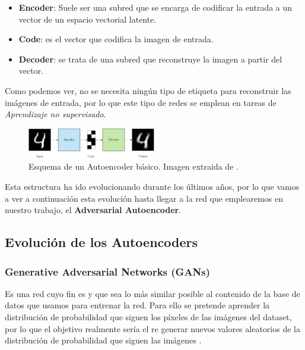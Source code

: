         \begin{itemize}
            \item \textbf{Encoder}: Suele ser una subred que se encarga de codificar la entrada a un vector de un espacio vectorial latente. 
            \item \textbf{Code}: es el vector que codifica la imagen de entrada. 
            \item \textbf{Decoder}: se trata de una subred que reconstruye la imagen a partir del vector.
        \end{itemize}

        \noindent Como podemos ver, no se necesita ningún tipo de etiqueta para reconstruir las imágenes de entrada, por lo que este tipo de redes se emplean en tareas de \textit{Aprendizaje no supervisado}.

        \begin{figure}[!h]
            \centering
            \includegraphics[width=0.5\textwidth]{img/Autoencoder.png}
            \caption{Esquema de un Autoencoder básico. Imagen extraida de \cite{GAN2}.}
            \label{fig:Autoencoder}
        \end{figure}

        \medskip 

        \noindent Esta estructura ha ido evolucionando durante los últimos años, por lo que vamos a ver a continuación esta evolución hasta llegar a la red que emplearemos en nuestro trabajo, el \textbf{Adversarial Autoencoder}.

    \subsection{Evolución de los Autoencoders}
        \subsubsection{Generative Adversarial Networks (GANs)}
            \noindent Es una red cuyo fin es  y que sea lo más similar posible al contenido de la base de datos que usamos para entrenar la red. Para ello se pretende aprender la distribución de probabilidad que siguen los píxeles de las imágenes del dataset, por lo que el objetivo realmente sería el re generar nuevos valores aleatorios de la distribución de probabilidad que siguen las imágenes \cite{GAN}. 

